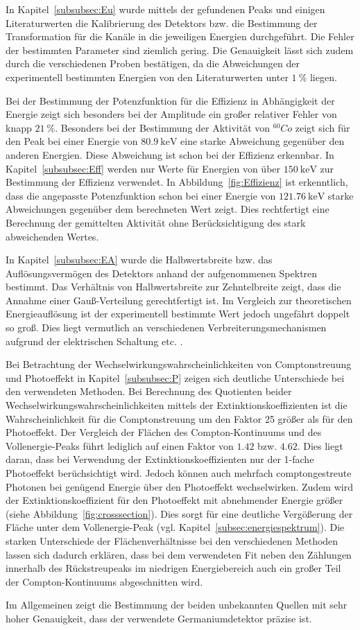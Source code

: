 In Kapitel~\ref{subsubsec:Eu} wurde mittels der gefundenen Peaks und einigen Literaturwerten
die Kalibrierung des Detektors bzw. die Bestimmung der Transformation für die Kanäle
in die jeweiligen Energien durchgeführt. Die Fehler der bestimmten Parameter
sind ziemlich gering. Die Genauigkeit lässt sich zudem durch die
verschiedenen Proben bestätigen, da die Abweichungen der experimentell bestimmten
Energien von den Literaturwerten unter $\SI{1}{\percent}$ liegen.

Bei der Bestimmung der Potenzfunktion für die Effizienz in Abhängigkeit der Energie
zeigt sich besonders bei der Amplitude ein großer relativer Fehler von knapp
$\SI{21}{\percent}$. Besonders bei der Bestimmung der Aktivität von $^{60}{Co}$
zeigt sich für den Peak bei
einer Energie von $\SI{80.9}{\kilo\eV}$ eine starke Abweichung gegenüber den anderen
Energien. Diese Abweichung ist schon bei der Effizienz erkennbar. In Kapitel~\ref{subsubsec:Eff}
werden nur Werte für Energien von über $\SI{150}{\kilo\eV}$ zur
Bestimmung der Effizienz verwendet. In Abbildung~\ref{fig:Effizienz} ist erkenntlich,
dass die angepasste Potenzfunktion schon bei einer Energie von $\SI{121.76}{\kilo\eV}$
starke Abweichungen gegenüber dem berechneten Wert zeigt. Dies rechtfertigt eine
Berechnung der gemittelten Aktivität ohne Berücksichtigung des stark abweichenden
Wertes.

In Kapitel~\ref{subsubsec:EA} wurde die Halbwertsbreite bzw. das Auflösungsvermögen
des Detektors anhand der aufgenommenen Spektren bestimmt. Das Verhältnis von
Halbwertsbreite zur Zehntelbreite zeigt, dass die Annahme einer Gauß-Verteilung
gerechtfertigt ist. Im Vergleich zur theoretischen Energieauflösung ist der
experimentell bestimmte Wert jedoch ungefährt doppelt so groß. Dies liegt vermutlich
an verschiedenen Verbreiterungsmechanismen aufgrund der elektrischen Schaltung etc. .

Bei Betrachtung der Wechselwirkungswahrscheinlichkeiten von Comptonstreuung und
Photoeffekt in Kapitel~\ref{subsubsec:P} zeigen sich deutliche Unterschiede
bei den verwendeten Methoden. Bei Berechnung des Quotienten beider
Wechselwirkungswahrscheinlichkeiten mittels der Extinktionskoeffizienten
ist die Wahrscheinlichkeit für die Comptonstreuung um den Faktor 25 größer als
für den Photoeffekt. Der Vergleich der Flächen des Compton-Kontinuums und des
Vollenergie-Peaks führt lediglich auf einen Faktor von $\num{1.42}$
bzw. $\num{4.62}$. Dies liegt daran, dass bei Verwendung der Extinktionskoeffizienten
nur der 1-fache Photoeffekt berüchsichtigt wird. Jedoch können auch mehrfach
comptongestreute Photonen bei genügend Energie über den Photoeffekt wechselwirken.
Zudem wird der Extinktionskoeffizient für den Photoeffekt mit abnehmender Energie
größer (siehe Abbildung~\ref{fig:crosssection}). Dies sorgt für eine deutliche
Vergößerung der Fläche unter dem Vollenergie-Peak (vgl. Kapitel~\ref{subsec:energiespektrum}).
Die starken Unterschiede der Flächenverhältnisse bei den verschiedenen Methoden
lassen sich dadurch erklären, dass bei dem verwendeten Fit neben den Zählungen
innerhalb des Rückstreupeaks im niedrigen Energiebereich auch ein großer
Teil der Compton-Kontinuums abgeschnitten wird.

Im Allgemeinen zeigt die Bestimmung der beiden unbekannten Quellen mit sehr hoher
Genauigkeit, dass der verwendete Germaniumdetektor präzise ist.
